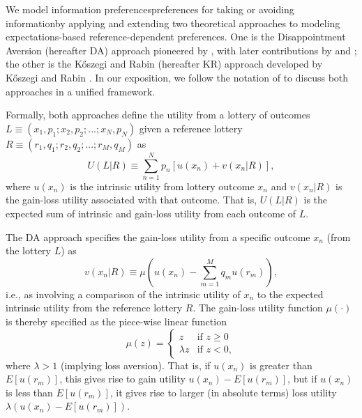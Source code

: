 \sloppy We model information preferences\textemdash preferences for taking or avoiding information\textemdash by applying and extending two theoretical approaches to modeling expectations-based reference-dependent preferences. One is the Disappointment Aversion (hereafter DA) approach pioneered by \citet{bellDisappointmentDecisionMaking1985}, with later contributions by \citet{loomesDisappointmentDynamicConsistency1986} and \citet{gulTheoryDisappointmentAversion1991}; the other is the Kőszegi and Rabin (hereafter KR) approach developed by Kőszegi and Rabin \citep{koszegiModelReferenceDependentPreferences2006,koszegiReferenceDependentRiskAttitudes2007}. In our exposition, we follow the notation of \citet{odonoghueChapterReferenceDependentPreferences2018} to discuss both approaches in a unified framework.

\sloppy Formally, both approaches define the utility from a lottery of outcomes $L \equiv (x_1,p_1;x_2,p_2;...;x_N,p_N)$ given a reference lottery $R \equiv (r_1,q_1;r_2,q_2;...;r_M,q_M)$ as
\begin{equation*}
  U(L|R) \equiv \sum_{n=1}^{N} p_n[u(x_n)+v(x_n|R)],
\end{equation*}
where $u(x_n)$ is the intrinsic utility from lottery outcome $x_n$ and $v(x_n|R)$ is the gain-loss utility associated with that outcome. That is, $U(L|R)$ is the expected sum of intrinsic and gain-loss utility from each outcome of $L$.

The DA approach specifies the gain-loss utility from a specific outcome $x_n$ (from the lottery $L$) as
\begin{equation*}
  v(x_n|R) \equiv \mu (u(x_n)-\sum_{m=1}^M q_mu(r_m)),
\end{equation*}
i.e., as involving a comparison of the intrinsic utility of $x_n$ to the expected intrinsic utility from the reference lottery $R$. The gain-loss utility function $\mu(\cdot)$ is thereby specified as the piece-wise linear function
\begin{equation*}
  \mu(z)=
  \begin{cases}
    z          & \text{if } z \geq 0 \\
    \lambda z  & \text{if } z < 0 ,
  \end{cases}
\end{equation*}
where $\lambda>1$ (implying loss aversion). That is, if $u(x_n)$ is greater than $E[u(r_m)]$, this gives rise to gain utility $u(x_n)-E[u(r_m)]$, but if $u(x_n)$ is less than $E[u(r_m)]$, it gives rise to larger (in absolute terms) loss utility $\lambda(u(x_n)-E[u(r_m)])$.

